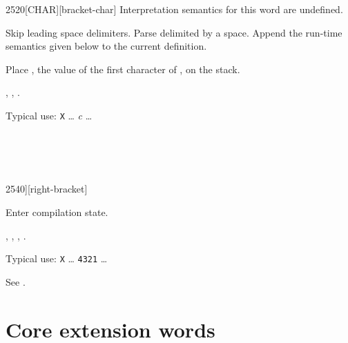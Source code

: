 \begin{worddef}{2520}{[CHAR]}[bracket-char]
\interpret
	Interpretation semantics for this word are undefined.

\compile

	Skip leading space delimiters. Parse  delimited
	by a space. Append the run-time semantics given below to the
	current definition.

\runtime

	Place , the value of the first character of
	, on the stack.

\see {},
	,
	.

	\begin{rationale} %
		Typical use:
			\word{:} \texttt{X} {\ldots}
				\word{[CHAR]} \emph{c}
				{\ldots} \word{;}
	\end{rationale}

	\begin{testing} %
		 \\
		 \\
		 \\
	\end{testing}
\end{worddef}


\begin{worddef}{2540}{]}[right-bracket]
\item \stack{}{}

	Enter compilation state.

\see {},
	,
	\wref{core:[}{[},
	\rref{core:]}{}.

	\begin{rationale} %
		Typical use:
			\word{:} \texttt{X} {\ldots}
				\word{[} \texttt{4321} \word{]} 
				{\ldots} \word{;}
	\end{rationale}

	\begin{testing} %
		See \tref{core:[}{[}.
	\end{testing}
\end{worddef}


\section{Core extension words} %
\extended

